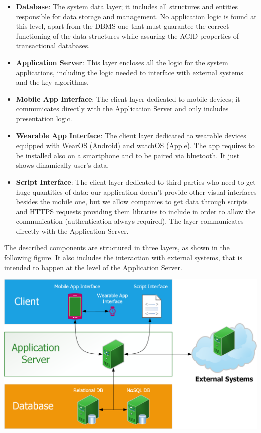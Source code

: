\begin{itemize}
\item \textbf{Database}: The system data layer; it includes all structures and entities responsible for data storage and management. No application logic is found at this level, apart from the DBMS one that must guarantee the correct functioning of the data structures while assuring the ACID properties of transactional databases.

\item \textbf{Application Server}: This layer encloses all the logic for the system applications, including the logic needed to interface with external systems and the key algorithms.

\item \textbf{Mobile App Interface}: The client layer dedicated to mobile devices; it communicates directly with the Application Server and only includes presentation logic.

\item \textbf{Wearable App Interface}: The client layer dedicated to wearable devices equipped with WearOS (Android) and watchOS (Apple). The app requires to be installed also on a smartphone and to be paired via bluetooth. It just shows dinamically user's data.

\item \textbf{Script Interface}:  The client layer dedicated to third parties who need to get huge quantities of data: our application doesn't provide other visual interfaces besides the mobile one, but we allow companies to get data through scripts and HTTPS requests providing them libraries to include in order to allow the communication (authentication always required). The layer communicates directly with the Application Server.
\end{itemize}

The described components are structured in three layers, as shown in the following figure. It also includes the interaction with external systems, that is intended to happen at the level of the Application Server.

\begin{center}
\includegraphics[scale=0.69]{sections/diagrams/layers.png}
\newline
{}
\end{center}

